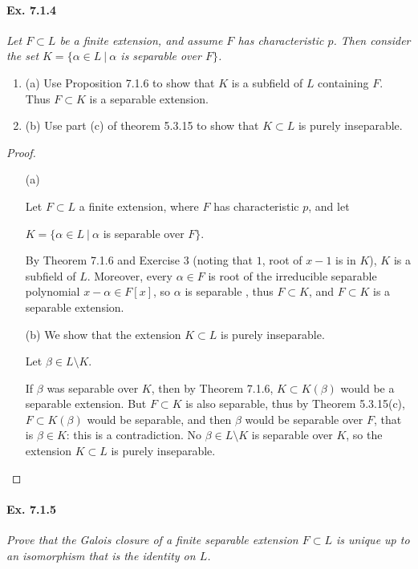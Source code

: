 \documentclass[11pt,a4paper]{article}
\newcommand{\be} {\begin{enumerate}}
\newcommand{\ee} {\end{enumerate}}
\begin{document}
\paragraph{Ex. 7.1.4}

{\it Let $F \subset L$ be a finite extension, and assume $F$ has characteristic $p$. Then consider the set $K = \{\alpha \in L \ | \ \alpha$ {\rm is separable over} $F\}$.
\be
\item[(a)] Use Proposition 7.1.6 to show that $K$ is a subfield of $L$ containing $F$. Thus $F \subset K$ is a separable extension.
\item[(b)] Use part (c) of theorem 5.3.15 to show that $K \subset L$ is purely inseparable.
\ee
}

\begin{proof}
\begin{enumerate}
\item[(a)]

Let $F\subset L$ a finite extension, where $F$ has characteristic $p$, and let 
\begin{center}
$K = \{\alpha \in L \ \vert \ \alpha$ is separable over $F\}$.
\end{center}
By Theorem 7.1.6 and Exercise 3 (noting that $1$, root of $x-1$ is in $K$), $K$ is a subfield of $L$. Moreover, every $\alpha\in F$ is root of the irreducible separable polynomial $x-\alpha \in F[x]$,  so $\alpha$ is separable , thus $F\subset K$, and $F \subset K$ is a separable extension. 

\item[(b)] We show that the extension $K\subset L$ is purely inseparable.

Let $\beta \in L \setminus K$. 

If $\beta$ was separable over $K$, then by Theorem 7.1.6, $ K \subset K(\beta)$ would be a separable extension. But $F \subset K$ is also separable, thus by Theorem 5.3.15(c), $F \subset K(\beta)$ would be separable, and then $\beta$ would be separable over $F$, that is $\beta \in K$: this is a contradiction. No $\beta \in L\setminus K$ is separable over $K$, so  the extension $K \subset L$ is purely inseparable.
\end{enumerate}
\end{proof}

\paragraph{Ex. 7.1.5}

{\it Prove that the Galois closure of a finite separable extension $F \subset L$ is unique up to an isomorphism that is the identity on $L$.
}
\end{document}
